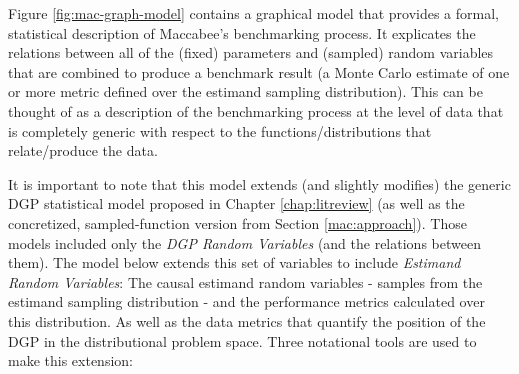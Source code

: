 \documentclass[../main.tex]{subfiles}
\begin{document}
Figure \ref{fig:mac-graph-model} contains a graphical model that provides a formal, statistical description of Maccabee's benchmarking process. It explicates the relations between all of the (fixed) parameters and (sampled) random variables that are combined to produce a benchmark result (a Monte Carlo estimate of one or more metric defined over the estimand sampling distribution). This can be thought of as a description of the benchmarking process at the level of data that is completely generic with respect to the functions/distributions that relate/produce the data.

\vspace{\baselineskip}

It is important to note that this model extends (and slightly modifies) the generic DGP statistical model proposed in Chapter \ref{chap:litreview} (as well as the concretized, sampled-function version from Section \ref{mac:approach}). Those models included only the \textit{DGP Random Variables} (and the relations between them). The model below extends this set of variables to include \textit{Estimand Random Variables}: The causal estimand random variables - samples from the estimand sampling distribution - and the performance metrics calculated over this distribution. As well as the data metrics that quantify the position of the DGP in the distributional problem space. Three notational tools are used to make this extension:
\end{document}
